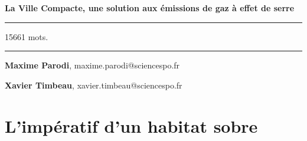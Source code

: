 \documentclass[
  9pt,
  a4paper,
  DIV=11]{scrreprt}
\renewcommand*\contentsname{Table des matières}
\newcommand\contentsname{Table des matières}
\begin{document}
\begin{titlepage}
\newpage
\pagestyle{empty}
\newpage
\pagestyle{empty}
 
\LARGE\textbf{La Ville Compacte, une solution aux émissions de gaz à
effet de serre}

\large\textbf{}

\vspace{1cm}


\par\rule{\textwidth}{0.5pt}

15661 mots.

\par\rule{\textwidth}{0.5pt}


\vspace{1cm}

\begin{flushright}
   \linespread{1}\small{\textbf{Maxime
Parodi}}, {\small{maxime.parodi@sciencespo.fr}}\par
   \linespread{1}\small{\textbf{Xavier
Timbeau}}, {\small{xavier.timbeau@sciencespo.fr}}\par
\end{flushright}
\end{titlepage}
\renewcommand*\contentsname{Table des matières}
{
\hypersetup{linkcolor=}
\setcounter{tocdepth}{0}
\tableofcontents
}
\chapter{L'impératif d'un habitat
sobre}\label{limpuxe9ratif-dun-habitat-sobre}
\end{document}
